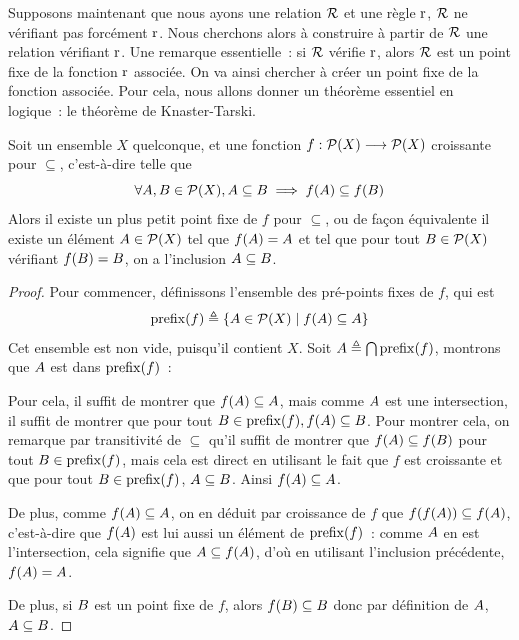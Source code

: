 Supposons maintenant que nous ayons une relation $\mathrel{\mathcal{R}}$ et une règle $\operatorname{r}$,
$\mathrel{\mathcal{R}}$ ne vérifiant pas forcément $\operatorname{r}$. Nous cherchons alors à construire
à partir de $\mathrel{\mathcal{R}}$ une relation vérifiant $\operatorname{r}$. Une remarque essentielle~:
si $\mathrel{\mathcal{R}}$ vérifie $\operatorname{r}$, alors $\mathrel{\mathcal{R}}$ est un point fixe de la fonction
$\operatorname{r}$ associée. On va ainsi chercher à créer un point fixe de la fonction
associée. Pour cela, nous allons donner un théorème essentiel en logique~: le
théorème de Knaster-Tarski.

\begin{theorem}
  \label{thm.ind.KT}
  Soit un ensemble $X$ quelconque, et une fonction
  $f : \displaystyle \mathcal{P}(X) \longrightarrow \mathcal{P} (X)$ croissante pour $\subseteq$,
  c'est-à-dire telle que
  \[\forall A,B\in\mathcal{P}(X), A\subseteq B
  \implies f(A)\subseteq f(B)\]
  Alors il existe un plus petit point fixe de $f$ pour $\subseteq$, ou de façon
  équivalente il existe un élément $A\in \mathcal{P}(X)$ tel que
  $f(A)=A$ et tel que pour tout $B\in\mathcal{P}(X)$ vérifiant
  $f(B)=B$, on a l'inclusion $A\subseteq B$.
\end{theorem}
\begin{proof}
  Pour commencer, définissons l'ensemble des pré-points fixes de $f$, qui est
  \[\operatorname{prefix}(f) \triangleq \left\{ A \in \mathcal{P}(X) \;\middle\vert\; f(A)\subseteq A \right\}\]
  Cet ensemble est non vide, puisqu'il contient $X$.
  Soit $A \triangleq \bigcap \operatorname{prefix}(f)$, montrons que $A$ est dans
  $\operatorname{prefix}(f)$~:

  Pour cela, il suffit de montrer que $f(A)\subseteq A$, mais comme
  $A$ est une intersection, il suffit de montrer que pour tout
  $B\in\operatorname{prefix}(f), f(A)\subseteq B$. Pour montrer cela, on
  remarque par transitivité de $\subseteq$ qu'il suffit de montrer que
  $f(A)\subseteq f(B)$ pour tout $B\in \operatorname{prefix}(f)$, mais cela
  est direct en utilisant le fait que $f$ est croissante et que pour tout
  $B\in \operatorname{prefix}(f)$, $A \subseteq B$. Ainsi
  $f(A)\subseteq A$.

  De plus, comme $f(A)\subseteq A$, on en déduit par croissance de
  $f$ que $f(f(A))\subseteq f(A)$, c'est-à-dire que $f(A)$ est
  lui aussi un élément de $\operatorname{prefix}(f)$~: comme $A$ en est l'intersection,
  cela signifie que $A \subseteq f(A)$, d'où en
  utilisant l'inclusion précédente, $f(A) = A$.

  De plus, si $B$ est un point fixe de $f$, alors
  $f(B)\subseteq B$ donc par définition de $A$,
  $A \subseteq B$.
\end{proof}

